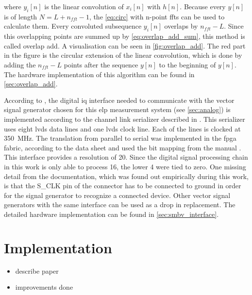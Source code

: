 \documentclass[12pt,a4paper,parskip=full,abstract=true,BCOR=10mm,twoside,open=right]{scrreprt}
\begin{document}
where $y_i[n]$ is the linear convolution of $x_i[n]$ with $h[n]$. Because every $y[n]$ is of length
$N = L + n_{fft} -1$, the \cref{eq:circ} with n-point \glspl{fft} can be used to calculate them.
Every convoluted subsequence $y_i[n]$ overlaps by $n_{fft} - L$. Since this overlapping
points are summed up by \cref{eq:overlap_add_sum}, this method is called overlap
add. A visualisation can be seen in \cref{fig:overlap_add}. The red part in the figure
is the circular extension of the linear convolution, which is done by adding the
$n_{fft} - L$ points after the sequence $y[n]$ to the beginning of $y[n]$. The hardware implementation
of this algorithm can be found in \cref{sec:overlap_add}.

According to \cite{fsq_b17}, the digital \gls{iq} interface needed to communicate
with the vector signal generator chosen for this \gls{elp} measurement
system (see \cref{sec:analog}) is implemented according to the channel link serializer described in \cite{ds90cr485}. This
serializer uses eight \gls{lvds} data lines and one \gls{lvds} clock line. Each of the lines
is clocked at \SI{350}{\mega\hertz}. The translation from parallel to serial was implemented
in the \gls{fpga} fabric, according to the data sheet \cite{ds90cr485} and used
the bit mapping from the manual \cite{fsq_b17}. This interface provides a resolution of \SI{20}{\bit}.
Since the digital signal processing chain in this work is only able to process \SI{16}{\bit},
the lower \SI{4}{\bit} were tied to zero. One missing detail from the documentation,
which was found out empirically during this work, is that the S\_CLK pin of the connector
has to be connected to ground in order for the signal generator to recognize a connected
device. Other vector signal generators with the same interface can be used as a drop in
replacement. The detailed hardware implementation can be found in \cref{sec:smbv_interface}.


\chapter{ Implementation}
\label{chap:fpga}

\begin{itemize}
    \item describe paper \cite{hashim_active_2008}
    \item improvements done
\end{itemize}
\end{document}
